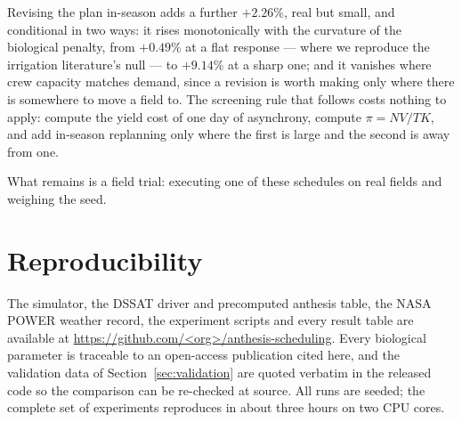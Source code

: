 \documentclass[10pt,twocolumn]{article}
\begin{document}
Revising the plan in-season adds a further $+2.26$\%,
real but small, and conditional in two ways: it rises monotonically
with the curvature of the biological penalty, from $+0.49$\%
at a flat response --- where we reproduce the irrigation literature's
null --- to $+9.14$\% at a sharp one; and it vanishes
where crew capacity matches demand, since a revision is worth making
only where there is somewhere to move a field to. The screening rule
that follows costs nothing to apply: compute the yield cost of one day
of asynchrony, compute $\pi = NV/TK$, and add in-season replanning
only where the first is large and the second is away from one.

What remains is a field trial: executing one of these schedules on
real fields and weighing the seed.

\section{Reproducibility}
The simulator, the DSSAT driver and precomputed anthesis table, the NASA
POWER weather record, the experiment scripts and every result table are
available at \url{https://github.com/<org>/anthesis-scheduling}. Every biological parameter is traceable to
an open-access publication cited here, and the validation data of
Section~\ref{sec:validation} are quoted verbatim in the released code so
the comparison can be re-checked at source. All runs are seeded; the
complete set of experiments reproduces in about three hours on two
CPU cores.
\end{document}

